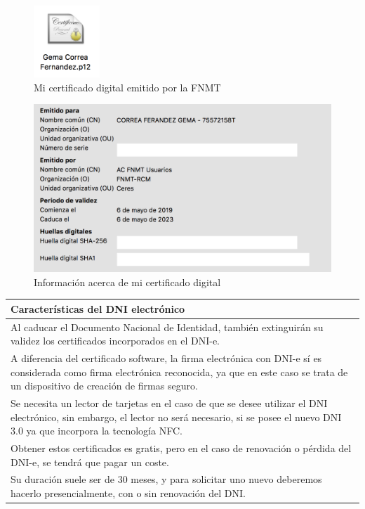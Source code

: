 \documentclass{manual}
\begin{document}
\begin{figure}[H]
	\centering
	\includegraphics[width=25mm]{images/certificado}
	\caption{Mi certificado digital emitido por la FNMT} 
\end{figure}

\begin{figure}[H]
	\centering
	\includegraphics[width=120mm]{images/certificado1}
	\caption{Información acerca de mi certificado digital} 
\end{figure}

\begin{table}[H]
	\begin{tabular}{|m{14cm}|}
		\hline
		\textbf{Características del DNI electrónico} \\ \hline\hline
		Al caducar el Documento Nacional de Identidad, también extinguirán su validez los certificados incorporados en el DNI-e. \\ \hline
		A diferencia del certificado software, la firma electrónica con DNI-e sí es considerada como firma electrónica reconocida, ya que en este caso se trata de un dispositivo de creación de firmas seguro.\\ \hline
		Se necesita un lector de tarjetas en el caso de que se desee utilizar el DNI electrónico, sin embargo, el lector no será necesario, si se posee el nuevo DNI 3.0 ya que incorpora la tecnología NFC.\\ \hline
		Obtener estos certificados es gratis, pero en el caso de renovación o pérdida del DNI-e, se tendrá que pagar un coste.\\ \hline
		Su duración suele ser de 30 meses, y para solicitar uno nuevo deberemos hacerlo presencialmente, con o sin renovación del DNI.\\ \hline
	\end{tabular}
\end{table}
\end{document}
